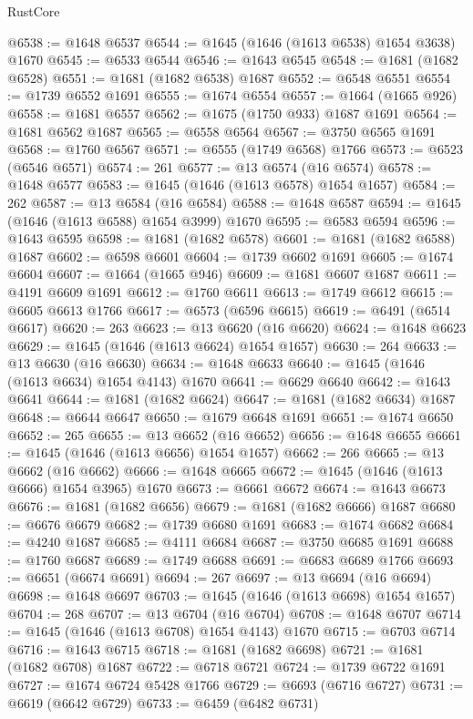 \begin{lexlean}{RustCore}
\begin{coremodule}
@6538 := @1648 @6537
@6544 := @1645 (@1646 (@1613 @6538) @1654 @3638) @1670
@6545 := @6533 @6544
@6546 := @1643 @6545
@6548 := @1681 (@1682 @6528)
@6551 := @1681 (@1682 @6538) @1687
@6552 := @6548 @6551
@6554 := @1739 @6552 @1691
@6555 := @1674 @6554
@6557 := @1664 (@1665 @926)
@6558 := @1681 @6557
@6562 := @1675 (@1750 @933) @1687 @1691
@6564 := @1681 @6562 @1687
@6565 := @6558 @6564
@6567 := @3750 @6565 @1691
@6568 := @1760 @6567
@6571 := @6555 (@1749 @6568) @1766
@6573 := @6523 (@6546 @6571)
@6574 := 261
@6577 := @13 @6574 (@16 @6574)
@6578 := @1648 @6577
@6583 := @1645 (@1646 (@1613 @6578) @1654 @1657)
@6584 := 262
@6587 := @13 @6584 (@16 @6584)
@6588 := @1648 @6587
@6594 := @1645 (@1646 (@1613 @6588) @1654 @3999) @1670
@6595 := @6583 @6594
@6596 := @1643 @6595
@6598 := @1681 (@1682 @6578)
@6601 := @1681 (@1682 @6588) @1687
@6602 := @6598 @6601
@6604 := @1739 @6602 @1691
@6605 := @1674 @6604
@6607 := @1664 (@1665 @946)
@6609 := @1681 @6607 @1687
@6611 := @4191 @6609 @1691
@6612 := @1760 @6611
@6613 := @1749 @6612
@6615 := @6605 @6613 @1766
@6617 := @6573 (@6596 @6615)
@6619 := @6491 (@6514 @6617)
@6620 := 263
@6623 := @13 @6620 (@16 @6620)
@6624 := @1648 @6623
@6629 := @1645 (@1646 (@1613 @6624) @1654 @1657)
@6630 := 264
@6633 := @13 @6630 (@16 @6630)
@6634 := @1648 @6633
@6640 := @1645 (@1646 (@1613 @6634) @1654 @4143) @1670
@6641 := @6629 @6640
@6642 := @1643 @6641
@6644 := @1681 (@1682 @6624)
@6647 := @1681 (@1682 @6634) @1687
@6648 := @6644 @6647
@6650 := @1679 @6648 @1691
@6651 := @1674 @6650
@6652 := 265
@6655 := @13 @6652 (@16 @6652)
@6656 := @1648 @6655
@6661 := @1645 (@1646 (@1613 @6656) @1654 @1657)
@6662 := 266
@6665 := @13 @6662 (@16 @6662)
@6666 := @1648 @6665
@6672 := @1645 (@1646 (@1613 @6666) @1654 @3965) @1670
@6673 := @6661 @6672
@6674 := @1643 @6673
@6676 := @1681 (@1682 @6656)
@6679 := @1681 (@1682 @6666) @1687
@6680 := @6676 @6679
@6682 := @1739 @6680 @1691
@6683 := @1674 @6682
@6684 := @4240 @1687
@6685 := @4111 @6684
@6687 := @3750 @6685 @1691
@6688 := @1760 @6687
@6689 := @1749 @6688
@6691 := @6683 @6689 @1766
@6693 := @6651 (@6674 @6691)
@6694 := 267
@6697 := @13 @6694 (@16 @6694)
@6698 := @1648 @6697
@6703 := @1645 (@1646 (@1613 @6698) @1654 @1657)
@6704 := 268
@6707 := @13 @6704 (@16 @6704)
@6708 := @1648 @6707
@6714 := @1645 (@1646 (@1613 @6708) @1654 @4143) @1670
@6715 := @6703 @6714
@6716 := @1643 @6715
@6718 := @1681 (@1682 @6698)
@6721 := @1681 (@1682 @6708) @1687
@6722 := @6718 @6721
@6724 := @1739 @6722 @1691
@6727 := @1674 @6724 @5428 @1766
@6729 := @6693 (@6716 @6727)
@6731 := @6619 (@6642 @6729)
@6733 := @6459 (@6482 @6731)

\end{coremodule}
\end{lexlean}
